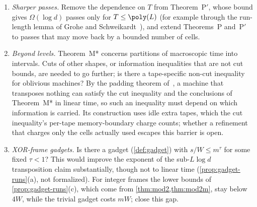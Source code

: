 \begin{enumerate}[label=\arabic*.,leftmargin=2em]
\item \emph{Sharper passes.} Remove the dependence on $T$ from Theorem~P$'$, whose bound gives $\Omega(\log d)$ passes only
for $T\le\poly(L)$ (for example through the run-length lemma of Grohe and Schweikardt~\cite{GroheSchweikardt2005}), and extend Theorems~P and~P$'$ to passes that may move
back by a bounded number of cells.

\item \emph{Beyond levels.} Theorem~M* concerns partitions of macroscopic time into intervals. Cuts of other shapes, or
information inequalities that are not cut bounds, are needed to go further; is there a tape-specific non-cut inequality for oblivious machines? By the padding theorem of~\cite{BrendeAstra2026}, a machine that transposes nothing can satisfy the cut inequality and the conclusions of Theorem~M* in linear time, so such an inequality must depend on which information is carried. Its construction uses idle extra tapes, which the cut inequality's per-tape memory-boundary charge counts; whether a refinement that charges only the cells actually used escapes this barrier is open.

\item \emph{XOR-frame gadgets.} Is there a gadget (\cref{def:gadget}) with $s/W\le m^{\tau}$ for some fixed $\tau<1$? This would improve the exponent of the sub-$L\log d$ transposition claim substantially, though not to linear time (\cref{prop:gadget-runs}(a), not formalized). For integer frames the lower bounds of \cref{prop:gadget-runs}(c), which come from \cref{thm:mod2,thm:mod2m}, stay below $4W$, while the trivial gadget costs $mW$; close this gap.
\end{enumerate}
